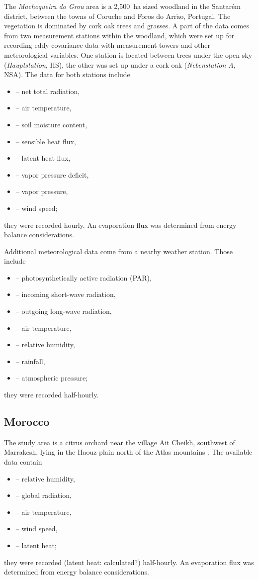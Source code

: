 \documentclass{scrreprt}
\newenvironment{denseitem}{
  \begin{itemize}
    \setlength{\itemsep}{0pt}
    \setlength{\parskip}{0pt}
    \setlength{\parsep}{0pt}
}{
  \end{itemize}
}
\begin{document}
The \emph{Machoqueira do Grou} area is a 2,500~ha sized woodland in the Santar\'em district, between the towns of Coruche and Foros do Arr$\tilde{\text{a}}$o, Portugal.
The vegetation is dominated by cork oak trees and grasses.
A part of the data comes from two measurement stations within the woodland, which were set up for recording eddy covariance data with measurement towers and other meteorological variables.
One station is located between trees under the open sky (\emph{Hauptstation}, HS), the other was set up under a cork oak (\emph{Nebenstation A}, NSA).
The data for both stations include
\begin{denseitem}
  \item[--] net total radiation,
  \item[--] air temperature,
  \item[--] soil moisture content,
  \item[--] sensible heat flux,
  \item[--] latent heat flux,
  \item[--] vapor pressure deficit,
  \item[--] vapor pressure,
  \item[--] wind speed;
\end{denseitem}
%
they were recorded hourly.
An evaporation flux was determined from energy balance considerations.

Additional meteorological data come from a nearby weather station.
Those include
\begin{denseitem}
  \item[--] photosynthetically active radiation (PAR),
  \item[--] incoming short-wave radiation,
  \item[--] outgoing long-wave radiation,
  \item[--] air temperature,
  \item[--] relative humidity,
  \item[--] rainfall,
  \item[--] atmospheric pressure;
\end{denseitem}
%
they were recorded half-hourly.

\subsection{Morocco} \label{ssec:intro_areas_morocco}

The study area is a citrus orchard near the village Ait Cheikh, southwest of Marrakesh, lying in the Haouz plain north of the Atlas mountains \citep{mroos14}.
The available data contain
\begin{denseitem}
  \item[--] relative humidity,
  \item[--] global radiation,
  \item[--] air temperature,
  \item[--] wind speed,
  \item[--] latent heat;
\end{denseitem}
%
they were recorded (latent heat: calculated?) half-hourly.
An evaporation flux was determined from energy balance considerations.
\end{document}
